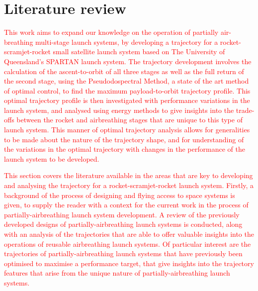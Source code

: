 
\cleardoublepage
\chapter{Literature review}\label{chapter:literature-review}



  \textcolor{red}{
This work aims to expand our knowledge on the operation of partially air-breathing multi-stage launch systems, by developing a trajectory for a rocket-scramjet-rocket small satellite launch system based on The University of Queensland's SPARTAN launch system. The trajectory development involves the calculation of the ascent-to-orbit of all three stages as well as the full return of the second stage, using the Pseudodospectral Method, a state of the art method of optimal control, to find the maximum payload-to-orbit trajectory profile. This optimal trajectory profile is then investigated with performance variations in the launch system, and analysed using energy methods to give insights into the trade-offs between the rocket and airbreathing stages that are unique to this type of launch system. This manner of optimal trajectory analysis allows for generalities to be made about the nature of the trajectory shape, and for understanding of the variations in the optimal trajectory with changes in the performance of the launch system to be developed.}

\textcolor{red}{
This section covers the literature available in the areas that are key to developing and analysing the trajectory for a rocket-scramjet-rocket launch system. Firstly, a background of the process of designing and flying access to space systems is given, to supply the reader with a context for the current work in the process of partially-airbreathing launch system development. 
A review of the previously developed designs of partially-airbreathing launch systems is conducted, along with an analysis of the trajectories that are able to offer valuable insights into the operations of reusable airbreathing launch systems. Of particular interest are the trajectories of partially-airbreathing launch systems that have previously been optimised to maximise a performance target, that give insights into the trajectory features that arise from the unique nature of partially-airbreathing launch systems. 
}
  
